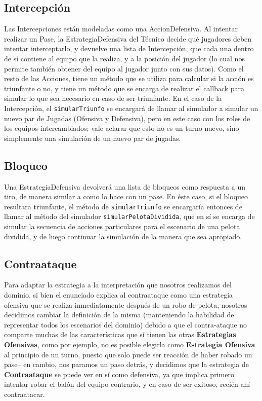 \subsection{Intercepción}
Las Intercepciones están modeladas como una AccionDefensiva. Al intentar realizar un Pase, la EstrategiaDefensiva del Técnico decide qué jugadores deben intentar interceptarlo, y devuelve una lista de Intercepción, que cada una dentro de sí contiene al equipo que la realiza, y a la posición del jugador (lo cual nos permite también obtener del equipo al jugador junto con sus datos). Como el resto de las Acciones, tiene un método que se utiliza para calcular si la acción es triunfante o no, y tiene un método que se encarga de realizar el callback para simular lo que sea necesario en caso de ser triunfante. En el caso de la Intercepción, el \texttt{simularTriunfo} se encargará de llamar al simulador a simular un nuevo par de Jugadas (Ofensiva y Defensiva), pero en este caso con los roles de los equipos intercambiados; vale aclarar que esto no es un turno nuevo, sino simplemente una simulación de un nuevo par de jugadas.

\subsection{Bloqueo}
Una EstrategiaDefensiva devolverá una lista de bloqueos como respuesta a un tiro, de manera similar a como lo hace con un pase. En éste caso, si el bloqueo resultara triunfante, el método de \texttt{simularTriunfo} se encargaría entonces de llamar al método del simulador \texttt{simularPelotaDividida}, que en sí se encarga de simular la secuencia de acciones particulares para el escenario de una pelota dividida, y de luego continuar la simulación de la manera que sea apropiado.

\subsection{Contraataque}

Para adaptar la estrategia a la interpretación que nosotros realizamos del dominio, si bien el enunciado explica al contraataque como una estrategia ofensiva que se realiza inmediatamente después de un robo de pelota, nosotros decidimos cambiar la definición de la misma (manteniendo la habilidad de representar todos los escenarios del dominio) debido a que el contra-ataque no comparte muchas de las características que sí tienen las otras \textbf{Estrategias Ofensivas}, como por ejemplo, no es posible elegirla como \textbf{Estrategia Ofensiva} al principio de un turno, puesto que solo puede ser reacción de haber robado un pase-- en cambio, nos paramos un paso detrás, y decidimos que la estrategia de \textbf{Contraataque} se puede ver en sí como defensiva, ya que implica primero intentar robar el balón del equipo contrario, y en caso de ser exitoso, recién ahí contraatacar.

